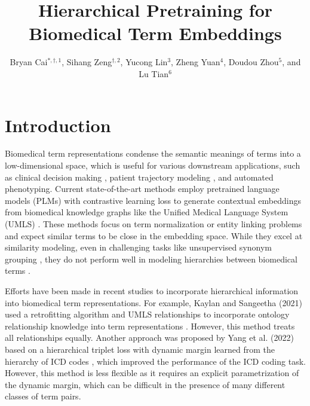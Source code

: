 \documentclass[12pt,a4paper]{cibb}
\title{\Large $\ $\\ \bf Hierarchical Pretraining for Biomedical Term Embeddings}
\author{\large Bryan Cai$^{*,\dagger,1}$, Sihang Zeng$^{\dagger,2}$, Yucong Lin$^3$, Zheng Yuan$^4$, Doudou Zhou$^5$, and Lu Tian$^6$}
\begin{document}
\thispagestyle{fancy}
\pagestyle{fancy}
\fancyhead{} %
\renewcommand{\headrulewidth}{0pt}
\fancyfoot{} %
\fancyfoot[C]{\thepage}



\section{\bf Introduction}
Biomedical term representations condense the semantic meanings of terms into a low-dimensional space, which is useful for various downstream applications, %
 such as clinical decision making %
, patient trajectory modeling %
, and automated phenotyping. %
Current state-of-the-art methods \cite{Yuan2020CODERKI,
Zeng2022AutomaticBT,Liu2020SelfAlignmentPF} employ pretrained language models (PLMs) with contrastive learning loss to generate contextual embeddings from biomedical knowledge graphs like the Unified Medical Language System (UMLS) \cite{Bodenreider2004TheUM}. These methods focus on term normalization or entity linking problems and expect similar terms to be close in the embedding space. While they excel at similarity modeling, even in challenging tasks like unsupervised synonym grouping \cite{Zeng2022AutomaticBT}, they do not perform well in modeling hierarchies between biomedical terms \cite{kalyan_hybrid_2021}.


Efforts have been made in recent studies to incorporate hierarchical information into biomedical term representations. For example, Kaylan and Sangeetha (2021) used a retrofitting algorithm and UMLS relationships to incorporate ontology relationship knowledge into term representations \cite{kalyan_hybrid_2021}. However, this method treats all relationships equally. Another approach was proposed by Yang et al. (2022) based on a hierarchical triplet loss with dynamic margin learned from the hierarchy of ICD codes \cite{yang_knowledge_2022, Braemer1988InternationalSC}, which improved the performance of the ICD coding task. However, this method is less flexible as it requires an explicit parametrization of the dynamic margin, which can be difficult in the presence of many different classes of term pairs. %
\end{document}
